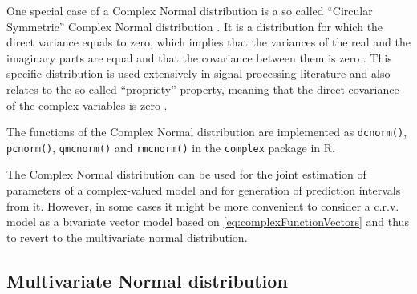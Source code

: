 \documentclass[
]{book}
\begin{document}
One special case of a Complex Normal distribution is a so called ``Circular Symmetric'' Complex Normal distribution \citep{Neeser1993}. It is a distribution for which the direct variance equals to zero, which implies that the variances of the real and the imaginary parts are equal and that the covariance between them is zero \citep[ studied its properties in more detail]{Amblard1996}. This specific distribution is used extensively in signal processing literature and also relates to the so-called ``propriety'' property, meaning that the direct covariance of the complex variables is zero \citep{Walden2009, Adali2011}.

The functions of the Complex Normal distribution are implemented as \texttt{dcnorm()}, \texttt{pcnorm()}, \texttt{qmcnorm()} and \texttt{rmcnorm()} in the \texttt{complex} package in R.

The Complex Normal distribution can be used for the joint estimation of parameters of a complex-valued model and for generation of prediction intervals from it. However, in some cases it might be more convenient to consider a c.r.v. model as a bivariate vector model based on \eqref{eq:complexFunctionVectors} and thus to revert to the multivariate normal distribution.

\hypertarget{MVNorm}{%
\subsection{Multivariate Normal distribution}\label{MVNorm}}
\end{document}
